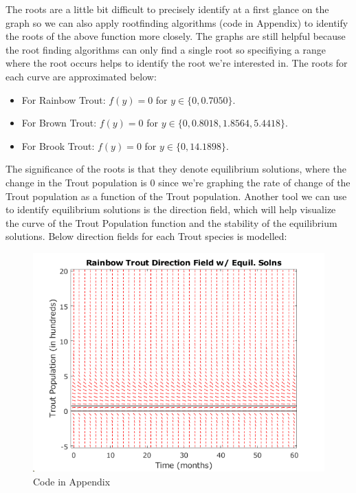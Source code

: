\documentclass[letterpaper,12pt]{article}
\begin{document}
The roots are a little bit difficult to precisely identify at a first glance on the graph so we can also apply rootfinding algorithms (code in Appendix) to identify the roots of the above function more closely. 
The graphs are still helpful because the root finding algorithms can only find a single root so specifiying a range where the root occurs helps to identify the root we're interested in.
The roots for each curve are approximated below:
\begin{itemize}
    \item For Rainbow Trout: \(f(y) = 0\) for \(y \in \{0, 0.7050\}\).
    \item For Brown Trout: \(f(y) = 0\) for \(y \in \{0, 0.8018, 1.8564, 5.4418\}\).
    \item For Brook Trout: \(f(y) = 0\) for \(y \in \{0, 14.1898\}\).
\end{itemize}
The significance of the roots is that they denote equilibrium solutions, where the change in the Trout population is 0 since we're graphing the rate of change of the Trout population as a function of the Trout population.
Another tool we can use to identify equilibrium solutions is the direction field, which will help visualize the curve of the Trout Population function and the stability of the equilibrium solutions.
Below direction fields for each Trout species is modelled:
\begin{figure}[H]
    \centering
    \includegraphics{./figures/fig.3.4.4.png}
    \caption{Code in Appendix}
    \label{fig:4}
\end{figure}
\end{document}
